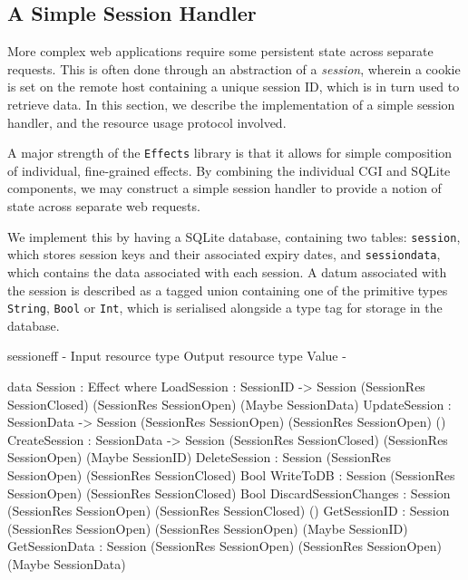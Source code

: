 \subsection{A Simple Session Handler}
More complex web applications require some persistent state across separate
requests. This is often done through an abstraction of a \textit{session},
wherein a cookie is set on the remote host containing a unique session ID,
which is in turn used to retrieve data. In this section, we describe the
implementation of a simple session handler, and the resource usage protocol
involved. 

A major strength of the \texttt{Effects} library is that it allows for simple
composition of individual, fine-grained effects. By combining the individual
CGI and SQLite components, we may construct a simple session handler to provide
a notion of state across separate web requests. 

We implement this by having a SQLite database, containing two tables:
\texttt{session}, which stores session keys and their associated expiry dates,
and \texttt{sessiondata}, which contains the data associated with each session.
A datum associated with the session is described as a tagged union containing
one of the primitive types \texttt{String}, \texttt{Bool} or \texttt{Int},
which is serialised alongside a type tag for storage in the database.

\begin{SaveVerbatim}{sessioneff}
{-                        { Input resource type }            { Output resource type }   { Value }        -}

data Session : Effect where
  LoadSession           : SessionID -> 
                          Session (SessionRes SessionClosed) (SessionRes SessionOpen)   (Maybe SessionData)
  UpdateSession         : SessionData -> 
                          Session (SessionRes SessionOpen)   (SessionRes SessionOpen)   ()
  CreateSession         : SessionData -> 
                          Session (SessionRes SessionClosed) (SessionRes SessionOpen)   (Maybe SessionID)
  DeleteSession         : Session (SessionRes SessionOpen)   (SessionRes SessionClosed) Bool 
  WriteToDB             : Session (SessionRes SessionOpen)   (SessionRes SessionClosed) Bool
  DiscardSessionChanges : Session (SessionRes SessionOpen)   (SessionRes SessionClosed) ()
  GetSessionID          : Session (SessionRes SessionOpen)   (SessionRes SessionOpen)   (Maybe SessionID)
  GetSessionData        : Session (SessionRes SessionOpen)   (SessionRes SessionOpen)   (Maybe SessionData)
\end{SaveVerbatim}

